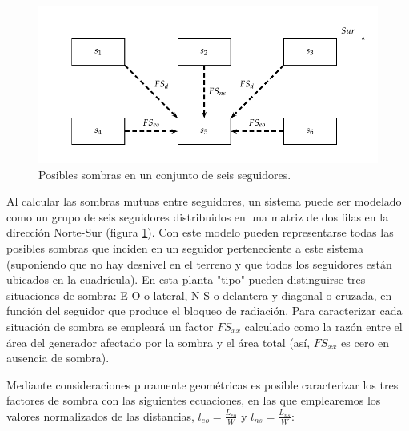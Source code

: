 %
\begin{figure}
\begin{centering}
\includegraphics{../figs/SixTrackerShadow}
\end{centering}

\caption{\label{fig:SeisSeguidores}Posibles sombras en un conjunto de seis
seguidores.}

\end{figure}


Al calcular las sombras mutuas entre seguidores, un sistema puede ser
modelado como un grupo de seis seguidores distribuidos en una matriz
de dos filas en la dirección Norte-Sur (figura
\ref{fig:SeisSeguidores}).  Con este modelo pueden representarse todas
las posibles sombras que inciden en un seguidor perteneciente a este
sistema (suponiendo que no hay desnivel en el terreno y que todos los
seguidores están ubicados en la cuadrícula).  En esta planta "tipo"
pueden distinguirse tres situaciones de sombra: E-O o lateral, N-S o
delantera y diagonal o cruzada, en función del seguidor que produce el
bloqueo de radiación.  Para caracterizar cada situación de sombra se
empleará un factor $FS_{xx}$ calculado como la razón entre el área del
generador afectado por la sombra y el área total (así, $FS_{xx}$ es
cero en ausencia de sombra).  
  

Mediante consideraciones puramente geométricas es posible caracterizar 
los tres factores de sombra con las siguientes ecuaciones, en las que
emplearemos los valores normalizados de las distancias,
$l_{eo}=\frac{L_{eo}}{W}$ y $l_{ns}=\frac{L_{ns}}{W}$:

